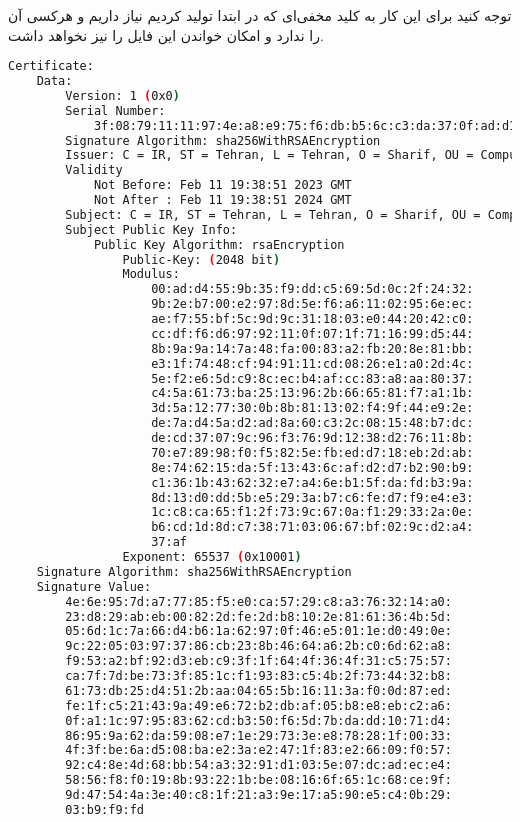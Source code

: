 توجه کنید برای این کار به کلید مخفی‌ای که در ابتدا تولید کردیم نیاز داریم و هرکسی آن را ندارد و امکان خواندن این فایل را نیز نخواهد داشت.

\begin{latin}
\begin{lstlisting}[language=bash]
Certificate:
    Data:
        Version: 1 (0x0)
        Serial Number:
            3f:08:79:11:11:97:4e:a8:e9:75:f6:db:b5:6c:c3:da:37:0f:ad:d1
        Signature Algorithm: sha256WithRSAEncryption
        Issuer: C = IR, ST = Tehran, L = Tehran, O = Sharif, OU = Computer Engineering, CN = localhost, emailAddress = mahdavifar2002[at]gmail.com
        Validity
            Not Before: Feb 11 19:38:51 2023 GMT
            Not After : Feb 11 19:38:51 2024 GMT
        Subject: C = IR, ST = Tehran, L = Tehran, O = Sharif, OU = Computer Engineering, CN = localhost, emailAddress = mahdavifar2002[at]gmail.com
        Subject Public Key Info:
            Public Key Algorithm: rsaEncryption
                Public-Key: (2048 bit)
                Modulus:
                    00:ad:d4:55:9b:35:f9:dd:c5:69:5d:0c:2f:24:32:
                    9b:2e:b7:00:e2:97:8d:5e:f6:a6:11:02:95:6e:ec:
                    ae:f7:55:bf:5c:9d:9c:31:18:03:e0:44:20:42:c0:
                    cc:df:f6:d6:97:92:11:0f:07:1f:71:16:99:d5:44:
                    8b:9a:9a:14:7a:48:fa:00:83:a2:fb:20:8e:81:bb:
                    e3:1f:74:48:cf:94:91:11:cd:08:26:e1:a0:2d:4c:
                    5e:f2:e6:5d:c9:8c:ec:b4:af:cc:83:a8:aa:80:37:
                    c4:5a:61:73:ba:25:13:96:2b:66:65:81:f7:a1:1b:
                    3d:5a:12:77:30:0b:8b:81:13:02:f4:9f:44:e9:2e:
                    de:7a:d4:5a:d2:ad:8a:60:c3:2c:08:15:48:b7:dc:
                    de:cd:37:07:9c:96:f3:76:9d:12:38:d2:76:11:8b:
                    70:e7:89:98:f0:f5:82:5e:fb:ed:d7:18:eb:2d:ab:
                    8e:74:62:15:da:5f:13:43:6c:af:d2:d7:b2:90:b9:
                    c1:36:1b:43:62:32:e7:a4:6e:b1:5f:da:fd:b3:9a:
                    8d:13:d0:dd:5b:e5:29:3a:b7:c6:fe:d7:f9:e4:e3:
                    1c:c8:ca:65:f1:2f:73:9c:67:0a:f1:29:33:2a:0e:
                    b6:cd:1d:8d:c7:38:71:03:06:67:bf:02:9c:d2:a4:
                    37:af
                Exponent: 65537 (0x10001)
    Signature Algorithm: sha256WithRSAEncryption
    Signature Value:
        4e:6e:95:7d:a7:77:85:f5:e0:ca:57:29:c8:a3:76:32:14:a0:
        23:d8:29:ab:eb:00:82:2d:fe:2d:b8:10:2e:81:61:36:4b:5d:
        05:6d:1c:7a:66:d4:b6:1a:62:97:0f:46:e5:01:1e:d0:49:0e:
        9c:22:05:03:97:37:86:cb:23:8b:46:64:a6:2b:c0:6d:62:a8:
        f9:53:a2:bf:92:d3:eb:c9:3f:1f:64:4f:36:4f:31:c5:75:57:
        ca:7f:7d:be:73:3f:85:1c:f1:93:83:c5:4b:2f:73:44:32:b8:
        61:73:db:25:d4:51:2b:aa:04:65:5b:16:11:3a:f0:0d:87:ed:
        fe:1f:c5:21:43:9a:49:e6:72:b2:db:af:05:b8:e8:eb:c2:a6:
        0f:a1:1c:97:95:83:62:cd:b3:50:f6:5d:7b:da:dd:10:71:d4:
        86:95:9a:62:da:59:08:e7:1e:29:73:3e:e8:78:28:1f:00:33:
        4f:3f:be:6a:d5:08:ba:e2:3a:e2:47:1f:83:e2:66:09:f0:57:
        92:c4:8e:4d:68:bb:54:a3:32:91:d1:03:5e:07:dc:ad:ec:e4:
        58:56:f8:f0:19:8b:93:22:1b:be:08:16:6f:65:1c:68:ce:9f:
        9d:47:54:4a:3e:40:c8:1f:21:a3:9e:17:a5:90:e5:c4:0b:29:
        03:b9:f9:fd
\end{lstlisting}
\end{latin}

